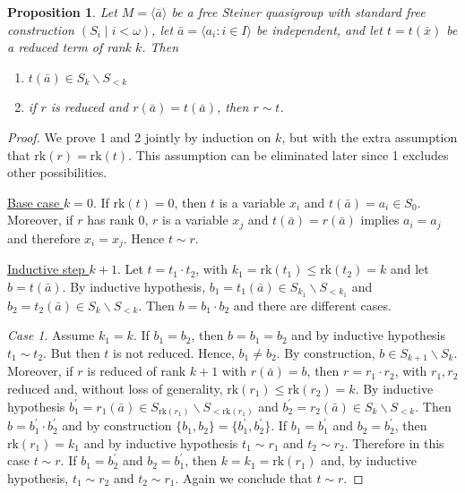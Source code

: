 \documentclass[a4paper, 11pt]{article}
\newcommand{\rk}{\mathrm{rk}}
\theoremstyle{note}
\newtheorem{prop}[thm]{Proposition}
\begin{document}
	\begin{prop}\label{May19_1}
		Let $M=\langle \bar{a}\rangle$ be a free Steiner quasigroup with standard free construction $(S_i\mid i<\omega)$, let  $\bar{a}= \langle a_i : i \in I \rangle$ be  independent, and let $t= t(\bar{x})$ be a reduced term of rank $k$. Then
		\begin{enumerate}
			\item $t(\bar{a})\in S_k\smallsetminus S_{<k}$
			\item if $r$ is reduced and  $r(\bar{a})= t(\bar{a})$, then $r\sim t$.
		\end{enumerate}
	\end{prop}
	\begin{proof} We prove 1 and 2 jointly by induction on $k$, but with the extra assumption that $\rk(r)=\rk(t)$. This assumption can be eliminated  later since 1 excludes other possibilities.
		
		\underline{Base case $k=0$}.  If $\rk(t)=0$, then $t$ is a variable $x_i$ and  $t(\bar{a})= a_i\in S_0$.  Moreover, if $r$ has rank 0, $r$ is a variable $x_j$  and  $t(\bar{a})= r(\bar{a})$  implies $a_i =a_j$ and therefore  $x_i = x_j$. Hence  $t\sim r$.
		
		\underline{Inductive step $k+1$}.  Let $t= t_1\cdot t_2$, with $k_1= \rk(t_1)\leq \rk(t_2) = k$ and let  $b= t(\bar{a})$.  By inductive hypothesis, $b_1= t_1(\bar{a})\in S_{k_1}\smallsetminus S_{<k_1}$ and $b_2= t_2(\bar{a})\in S_k\smallsetminus S_{<k}$. Then $b= b_1\cdot b_2$ and there are different cases.
		
		\emph{Case 1}. Assume $k_1 = k$.  If  $b_1 = b_2$, then $b= b_1= b_2$ and by inductive hypothesis $t_1\sim t_2$. But then $t$ is not reduced. Hence, 
		$b_1\neq b_2$. By construction, $b\in S_{k+1}\smallsetminus S_k$.  Moreover, if $r$ is reduced of rank $k+1$ with $r(\bar{a})= b$, then $r= r_1\cdot r_2$, with $r_1,r_2$ reduced and, without loss of generality, $\rk(r_1)\leq \rk(r_2)= k$. By inductive hypothesis $b_1^\prime = r_1(\bar{a})\in S_{\rk(r_1)}\smallsetminus S_{<\rk(r_1)}$  and $b_2^\prime = r_2(\bar{a})\in S_k\smallsetminus S_{<k}$. Then $b= b_1^\prime\cdot b_2^\prime$ and by construction $\{b_1,b_2\}= \{b_1^\prime,b_2^\prime\}$. If $b_1= b_1^\prime$ and $b_2 = b_2^\prime$, then $\rk(r_1)= k_1$ and by inductive hypothesis $t_1\sim r_1$ and $t_2\sim r_2$. Therefore in this case $t\sim r$. If $b_1= b_2^\prime$ and $b_2= b_1^\prime$, then $k=k_1= \rk(r_1)$ and, by inductive hypothesis, $t_1\sim r_2$ and $t_2\sim r_1$. Again we conclude that $t\sim r$.
		

\end{proof}
\end{document}
